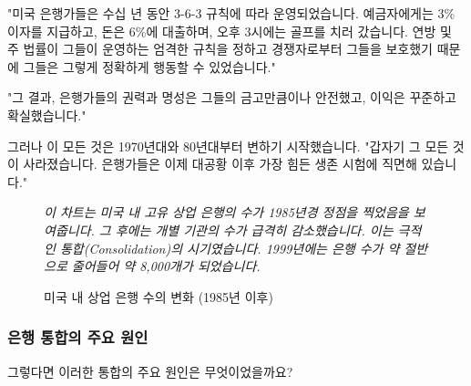 \documentclass[11pt,a4paper]{book}
\theoremstyle{definition}
\begin{document}
\begin{examplebox}[title={3-6-3 규칙에 대한 인용문}]
"미국 은행가들은 수십 년 동안 3-6-3 규칙에 따라 운영되었습니다. 예금자에게는 3\% 이자를 지급하고, 돈은 6\%에 대출하며, 오후 3시에는 골프를 치러 갔습니다. 연방 및 주 법률이 그들이 운영하는 엄격한 규칙을 정하고 경쟁자로부터 그들을 보호했기 때문에 그들은 그렇게 정확하게 행동할 수 있었습니다."

"그 결과, 은행가들의 권력과 명성은 그들의 금고만큼이나 안전했고, 이익은 꾸준하고 확실했습니다."
\end{examplebox}

그러나 이 모든 것은 1970년대와 80년대부터 변하기 시작했습니다. "갑자기 그 모든 것이 사라졌습니다. 은행가들은 이제 대공황 이후 가장 힘든 생존 시험에 직면해 있습니다."

\begin{figure}[h!]
    \centering
    \caption{미국 내 상업 은행 수의 변화 (1985년 이후)}
    \label{fig:commercial_banks_peak}
    \textit{이 차트는 미국 내 고유 상업 은행의 수가 1985년경 정점을 찍었음을 보여줍니다. 그 후에는 개별 기관의 수가 급격히 감소했습니다. 이는 극적인 통합(Consolidation)의 시기였습니다. 1999년에는 은행 수가 약 절반으로 줄어들어 약 8,000개가 되었습니다.}
\end{figure}

\subsubsection*{은행 통합의 주요 원인}
그렇다면 이러한 통합의 주요 원인은 무엇이었을까요?
\end{document}
